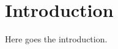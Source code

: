 \documentclass[msc,proposal,hideall,showtitle,showcover,showtoc]{ppgccufmg}  %
\begin{document}

\chapter{Introduction} \label{chap:introduction}

Here goes the introduction.


\end{document}
